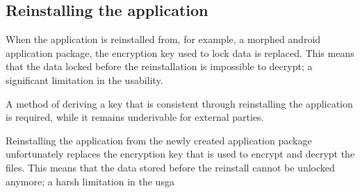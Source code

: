 \subsection{Reinstalling the application}
When the application is reinstalled from, for example, a morphed android application package, the encryption key used to lock data is replaced.
This means that the data locked before the reinstallation is impossible to decrypt; a significant limitation in the usability.

A method of deriving a key that is consistent through reinstalling the application is required, while it remains underivable for external parties.

Reinstalling the application from the newly created application package unfortunately replaces the encryption key that is used to encrypt and decrypt the files.
This means that the data stored before the reinstall cannot be unlocked anymore; a harsh limitation in the usga
